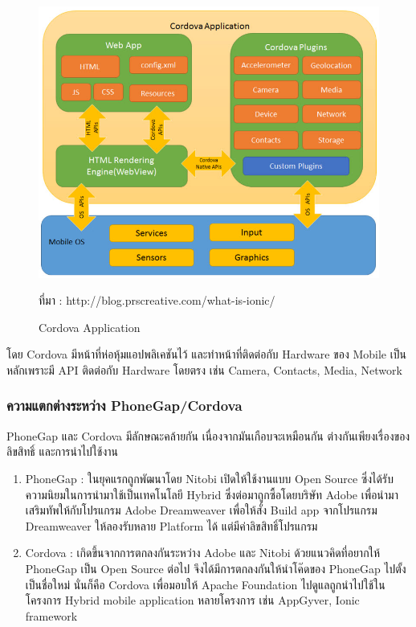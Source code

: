 		\begin{figure}[H]
			\centering
			\includegraphics[width=0.8\columnwidth]{Figures/2/ionic2}
			\caption{Cordova Application}{ที่มา : http://blog.prscreative.com/what-is-ionic/}
			\label{Fig:ionic1}
		\end{figure}

		โดย Cordova มีหน้าที่ห่อหุ้มแอปพลิเคชันไว้ และทำหน้าที่ติดต่อกับ Hardware ของ Mobile เป็นหลักเพราะมี API ติดต่อกับ Hardware โดยตรง เช่น Camera, Contacts, Media, Network
		
		\subsubsection{ความแตกต่างระหว่าง PhoneGap/Cordova} 
		PhoneGap และ Cordova มีลักษณะคล้ายกัน เนื่องจากมันเกือบจะเหมือนกัน ต่างกันเพียงเรื่องของลิขสิทธิ์ และการนำไปใช้งาน

		\begin{enumerate}[label=\arabic*)]
		\item PhoneGap : ในยุคแรกถูกพัฒนาโดย Nitobi เปิดให้ใช้งานแบบ Open Source ซึ่งได้รับความนิยมในการนำมาใช้เป็นเทคโนโลยี Hybrid ซึ่งต่อมาถูกซื้อโดยบริษัท Adobe เพื่อนำมาเสริมทัพให้กับโปรแกรม Adobe Dreamweaver เพื่อให้สั่ง Build app จากโปรแกรม Dreamweaver ให้ลองรับหลาย Platform ได้ แต่มีค่าลิขสิทธิ์โปรแกรม
		\item Cordova : เกิดขึ้นจากการตกลงกันระหว่าง Adobe และ Nitobi ด้วยแนวคิดที่อยากให้ PhoneGap เป็น Open Source ต่อไป จึงได้มีการตกลงกันให้นำโค๊ดของ PhoneGap ไปตั้งเป็นชื่อใหม่ นั่นก็คือ Cordova เพื่อมอบให้ Apache Foundation ไปดูแลถูกนำไปใช้ในโครงการ Hybrid mobile application หลายโครงการ เช่น AppGyver, Ionic framework
		\end{enumerate}

